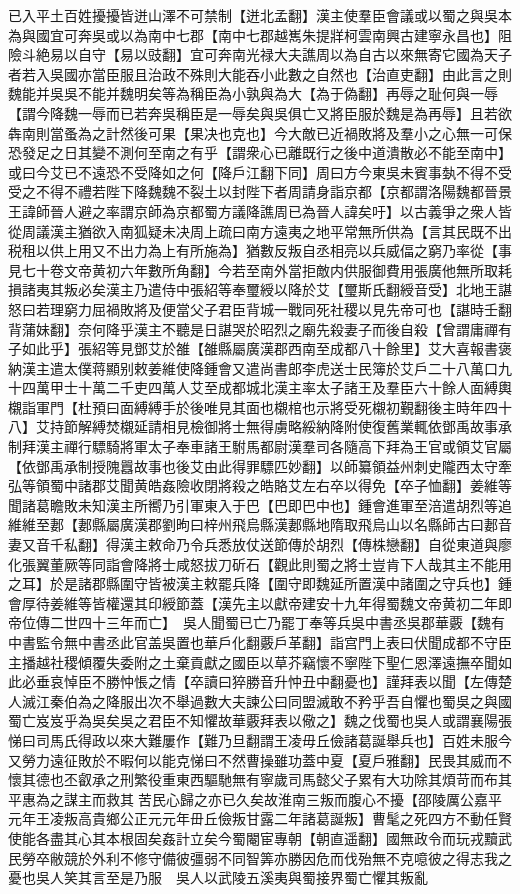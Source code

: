 已入平土百姓擾擾皆迸山澤不可禁制【迸北孟翻】漢主使羣臣會議或以蜀之與吳本為與國宜可奔吳或以為南中七郡【南中七郡越嶲朱提牂柯雲南興古建寧永昌也】阻險斗絶易以自守【易以豉翻】宜可奔南光禄大夫譙周以為自古以來無寄它國為天子者若入吳國亦當臣服且治政不殊則大能吞小此數之自然也【治直吏翻】由此言之則魏能并吳吳不能并魏明矣等為稱臣為小孰與為大【為于偽翻】再辱之耻何與一辱【謂今降魏一辱而已若奔吳稱臣是一辱矣與吳俱亡又將臣服於魏是為再辱】且若欲犇南則當蚤為之計然後可果【果决也克也】今大敵已近禍敗將及羣小之心無一可保恐發足之日其變不測何至南之有乎【謂衆心已離既行之後中道潰散必不能至南中】或曰今艾已不遠恐不受降如之何【降戶江翻下同】周曰方今東吳未賓事埶不得不受受之不得不禮若陛下降魏魏不裂土以封陛下者周請身詣京都【京都謂洛陽魏都晉景王諱師晉人避之率謂京師為京都蜀方議降譙周已為晉人諱矣吁】以古義爭之衆人皆從周議漢主猶欲入南狐疑未决周上疏曰南方遠夷之地平常無所供為【言其民既不出税租以供上用又不出力為上有所施為】猶數反叛自丞相亮以兵威偪之窮乃率從【事見七十卷文帝黄初六年數所角翻】今若至南外當拒敵内供服御費用張廣他無所取耗損諸夷其叛必矣漢主乃遣侍中張紹等奉璽綬以降於艾【璽斯氏翻綬音受】北地王諶怒曰若理窮力屈禍敗將及便當父子君臣背城一戰同死社稷以見先帝可也【諶時壬翻背蒲妹翻】奈何降乎漢主不聽是日諶哭於昭烈之廟先殺妻子而後自殺【曾謂庸禪有子如此乎】張紹等見鄧艾於雒【雒縣屬廣漢郡西南至成都八十餘里】艾大喜報書褒納漢主遣太僕蒋顯别敕姜維使降鍾會又遣尚書郎李虎送士民簿於艾戶二十八萬口九十四萬甲士十萬二千吏四萬人艾至成都城北漢主率太子諸王及羣臣六十餘人面縛輿櫬詣軍門【杜預曰面縛縛手於後唯見其面也櫬棺也示將受死櫬初覲翻後主時年四十八】艾持節解縛焚櫬延請相見檢御將士無得虜略綏納降附使復舊業輒依鄧禹故事承制拜漢主禪行驃騎將軍太子奉車諸王駙馬都尉漢羣司各隨高下拜為王官或領艾官屬【依鄧禹承制授隗囂故事也後艾由此得罪驃匹妙翻】以師纂領益州刺史隴西太守牽弘等領蜀中諸郡艾聞黄皓姦險收閉將殺之皓賂艾左右卒以得免【卒子恤翻】姜維等聞諸葛瞻敗未知漢主所嚮乃引軍東入于巴【巴即巴中也】鍾會進軍至涪遣胡烈等追維維至郪【郪縣屬廣漢郡劉昫曰梓州飛烏縣漢郪縣地隋取飛烏山以名縣師古曰郪音妻又音千私翻】得漢主敕命乃令兵悉放仗送節傳於胡烈【傳株戀翻】自從東道與廖化張翼董厥等同詣會降將士咸怒拔刀斫石【觀此則蜀之將士豈肯下人哉其主不能用之耳】於是諸郡縣圍守皆被漢主敕罷兵降【圍守即魏延所置漢中諸圍之守兵也】鍾會厚待姜維等皆權還其印綬節蓋【漢先主以獻帝建安十九年得蜀魏文帝黄初二年即帝位傳二世四十三年而亡】　吳人聞蜀已亡乃罷丁奉等兵吳中書丞吳郡華覈【魏有中書監令無中書丞此官盖吳置也華戶化翻覈戶革翻】詣宫門上表曰伏聞成都不守臣主播越社稷傾覆失委附之土棄貢獻之國臣以草芥竊懷不寧陛下聖仁恩澤遠撫卒聞如此必垂哀悼臣不勝忡悵之情【卒讀曰猝勝音升忡丑中翻憂也】謹拜表以聞【左傳楚人滅江秦伯為之降服出次不舉過數大夫諫公曰同盟滅敢不矜乎吾自懼也蜀吳之與國蜀亡岌岌乎為吳矣吳之君臣不知懼故華覈拜表以儆之】魏之伐蜀也吳人或謂襄陽張悌曰司馬氏得政以來大難屢作【難乃旦翻謂王凌毋丘儉諸葛誕舉兵也】百姓未服今又勞力遠征敗於不暇何以能克悌曰不然曹操雖功蓋中夏【夏戶雅翻】民畏其威而不懷其德也丕叡承之刑繁役重東西驅馳無有寧歲司馬懿父子累有大功除其煩苛而布其平惠為之謀主而救其苦民心歸之亦已久矣故淮南三叛而腹心不擾【邵陵厲公嘉平元年王凌叛高貴鄉公正元元年毌丘儉叛甘露二年諸葛誕叛】曹髦之死四方不動任賢使能各盡其心其本根固矣姦計立矣今蜀閹宦專朝【朝直遥翻】國無政令而玩戎黷武民勞卒敝競於外利不修守備彼彊弱不同智筭亦勝因危而伐殆無不克噫彼之得志我之憂也吳人笑其言至是乃服　吳人以武陵五溪夷與蜀接界蜀亡懼其叛亂